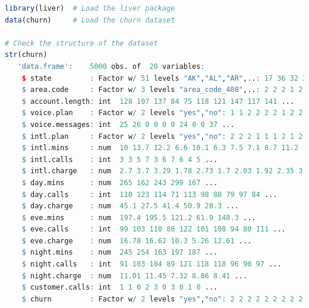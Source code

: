 \documentclass[
]{book}
\theoremstyle{definition}
\theoremstyle{definition}
\theoremstyle{definition}
\theoremstyle{definition}
\theoremstyle{remark}
\begin{document}
\begin{lstlisting}[language=R]
library(liver)  # Load the liver package
data(churn)     # Load the churn dataset

# Check the structure of the dataset
str(churn)
   'data.frame':    5000 obs. of  20 variables:
    $ state         : Factor w/ 51 levels "AK","AL","AR",..: 17 36 32 36 37 2 20 25 19 50 ...
    $ area.code     : Factor w/ 3 levels "area_code_408",..: 2 2 2 1 2 3 3 2 1 2 ...
    $ account.length: int  128 107 137 84 75 118 121 147 117 141 ...
    $ voice.plan    : Factor w/ 2 levels "yes","no": 1 1 2 2 2 2 1 2 2 1 ...
    $ voice.messages: int  25 26 0 0 0 0 24 0 0 37 ...
    $ intl.plan     : Factor w/ 2 levels "yes","no": 2 2 2 1 1 1 2 1 2 1 ...
    $ intl.mins     : num  10 13.7 12.2 6.6 10.1 6.3 7.5 7.1 8.7 11.2 ...
    $ intl.calls    : int  3 3 5 7 3 6 7 6 4 5 ...
    $ intl.charge   : num  2.7 3.7 3.29 1.78 2.73 1.7 2.03 1.92 2.35 3.02 ...
    $ day.mins      : num  265 162 243 299 167 ...
    $ day.calls     : int  110 123 114 71 113 98 88 79 97 84 ...
    $ day.charge    : num  45.1 27.5 41.4 50.9 28.3 ...
    $ eve.mins      : num  197.4 195.5 121.2 61.9 148.3 ...
    $ eve.calls     : int  99 103 110 88 122 101 108 94 80 111 ...
    $ eve.charge    : num  16.78 16.62 10.3 5.26 12.61 ...
    $ night.mins    : num  245 254 163 197 187 ...
    $ night.calls   : int  91 103 104 89 121 118 118 96 90 97 ...
    $ night.charge  : num  11.01 11.45 7.32 8.86 8.41 ...
    $ customer.calls: int  1 1 0 2 3 0 3 0 1 0 ...
    $ churn         : Factor w/ 2 levels "yes","no": 2 2 2 2 2 2 2 2 2 2 ...


\end{lstlisting}
\end{document}
